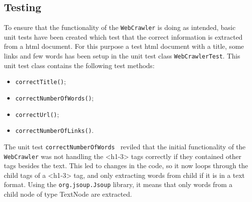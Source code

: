 \subsection{Testing}
To ensure that the functionality of the {\tt WebCrawler} is doing as intended, basic unit tests have been created which test that the correct information is extracted from a html document. For this purpose a test html document with a title, some links and few words has been setup in the unit test class {\tt WebCrawlerTest}. This unit test class contains the following test methods:
\begin{itemize}
    \item {\tt correctTitle()};
    \item {\tt correctNumberOfWords()};
    \item {\tt correctUrl()};
    \item {\tt correctNumberOfLinks()}.
\end{itemize}

The unit test {\tt correctNumberOfWords } reviled that the initial functionality of the {\tt WebCrawler} was not handling the <h1-3> tags correctly if they contained other tags besides the text. This led to changes in the code, so it now loops through the child tags of a <h1-3> tag, and only extracting words from child if it is in a text format. Using the {\tt org.jsoup.Jsoup} library, it means that only words from a child node of type TextNode are extracted.

